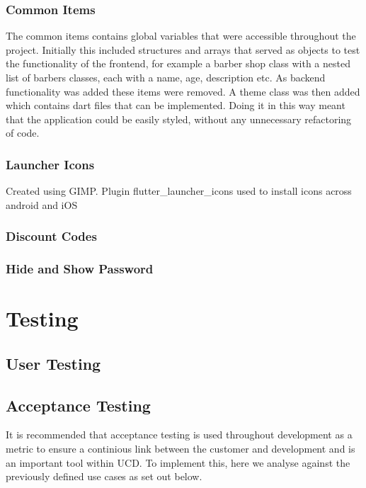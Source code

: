 \documentclass[12pt]{article}
\begin{document}
	\subsubsection{Common Items}
	The common items contains global variables that were accessible throughout the project. Initially this included structures and arrays that served as objects to test the functionality of the frontend, for example a barber shop class with a nested list of barbers classes, each with a name, age, description etc. As backend functionality was added these items were removed. A theme class was then added which contains dart files that can be implemented. Doing it in this way meant that the application could be easily styled, without any unnecessary refactoring of code.
	
	\subsubsection{Launcher Icons}
	Created using GIMP. Plugin flutter\_launcher\_icons used to install icons across android and iOS
	
	\subsubsection{Discount Codes}
	
	\subsubsection{Hide and Show Password}
	
	
	
	\section{Testing}
	\label{use-case-implementation}
	\subsection{User Testing}
	\subsection{Acceptance Testing}
	\cite{humbleContinuousDeliveryReliable2010}
	It is recommended that acceptance testing is used throughout development as a metric to ensure a continious link between the customer and development and is an important tool within UCD. To implement this, here we analyse against the previously defined use cases as set out below.
	
\end{document}
